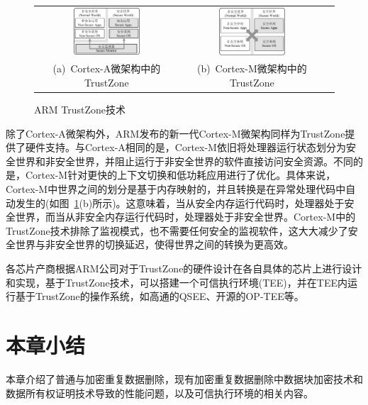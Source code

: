 \begin{figure}[!htb]
    \small
    \centering
    \begin{tabular}{@{}c@{}c@{}c}
        \includegraphics[width=0.49\textwidth]{pic/background/ARM-TZ-A.pdf} &
        \hspace{5pt}
        \includegraphics[width=0.49\textwidth]{pic/background/ARM-TZ-M.pdf}   \\
        \mbox{\small (a) Cortex-A微架构中的TrustZone}                       &
        \mbox{\small (b) Cortex-M微架构中的TrustZone}                         \\
    \end{tabular}
    \caption{ARM TrustZone技术}
    \label{fig:ARM-TZ-base}
\end{figure}

除了Cortex-A微架构外，ARM发布的新一代Cortex-M微架构\cite{cortex-m}同样为TrustZone提供了硬件支持。与Cortex-A相同的是，Cortex-M依旧将处理器运行状态划分为安全世界和非安全世界，并阻止运行于非安全世界的软件直接访问安全资源。不同的是，Cortex-M针对更快的上下文切换和低功耗应用进行了优化。具体来说，Cortex-M中世界之间的划分是基于内存映射的，并且转换是在异常处理代码中自动发生的(如图~\ref{fig:ARM-TZ-base}(b)所示)。这意味着，当从安全内存运行代码时，处理器处于安全世界，而当从非安全内存运行代码时，处理器处于非安全世界。Cortex-M中的TrustZone技术排除了监视模式，也不需要任何安全的监视软件，这大大减少了安全世界与非安全世界的切换延迟，使得世界之间的转换为更高效。

各芯片产商根据ARM公司对于TrustZone的硬件设计在各自具体的芯片上进行设计和实现，基于TrustZone技术，可以搭建一个可信执行环境(TEE)，并在TEE内运行基于TrustZone的操作系统，如高通的QSEE、开源的OP-TEE等。

\section{本章小结}

本章介绍了普通与加密重复数据删除，现有加密重复数据删除中数据块加密技术和数据所有权证明技术导致的性能问题，以及可信执行环境的相关内容。
